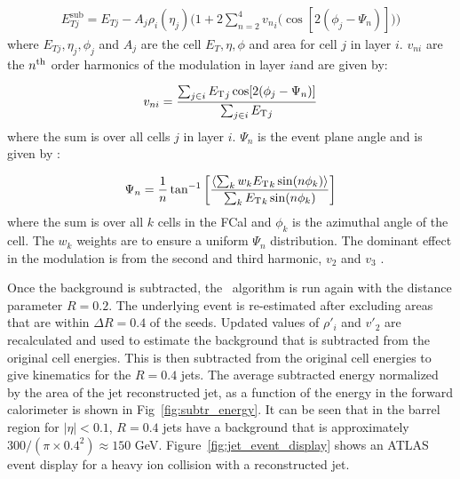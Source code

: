 \begin{align}
E_{Tj}^{\mathrm{sub}} = E_{Tj} - A_j \rho_i (\eta_j) \Big(1+2 \sum_{n=2}^{4} {v_{n}}_i \big(\cos[2(\phi_j-\Psi_n)] \big) \Big)
\end{align}
where $E_{Tj} , \eta_j, \phi_j$ and $A_j$ are the cell $E_T, \eta, \phi$ and area for cell $j$ in layer $i$.
$v_{ni}$ are the $n^{\rm th}$ order harmonics of the modulation in layer $i$and are given by:

\begin{align}
v_{ni} = \frac{\sum_{j \in i} \mbox{$E_{\mathrm{T}}$}_j \cos[2(\phi_j-\Psi_n)]}{\sum_{j \in i} \mbox{$E_{\mathrm{T}}$}_j}
\end{align}
where the sum is over all cells $j$ in layer $i$.
$\Psi_n$ is the event plane angle and is given by \cite{ATLAS:2012at}:

\begin{align}
\Psi_n = \frac{1}{n} \tan^{-1} \left[ \frac{\langle \sum_k w_k \mbox{$E_{\mathrm{T}}$}_k \sin(n\phi_k) \rangle}{\sum_k \mbox{$E_{\mathrm{T}}$}_k \sin(n\phi_k)} \right]
\end{align}
where the sum is over all $k$ cells in the FCal and $\phi_k$ is the azimuthal angle of the cell.
The $w_k$ weights are to ensure a uniform $\Psi_n$ distribution.
The dominant effect in the modulation is from the second and third harmonic, $v_2$ and $v_3$ \cite{ATLAS:2012at}.

Once the background is subtracted, the \antikt\ algorithm is run again with the distance parameter $R = 0.2$.
The underlying event is re-estimated after excluding areas that are within $\Delta R = 0.4$ of the seeds.
Updated values of $\rho{'}_i$ and $v{'}_2$ are recalculated and used to estimate the background that is subtracted from the original cell energies.
This is then subtracted from the original cell energies to give kinematics for the $R= 0.4$ jets.
The average subtracted energy normalized by the area of the jet reconstructed jet, as a function of the energy in the forward calorimeter is shown in Fig~\ref{fig:subtr_energy}.
It can be seen that in the barrel region for $|\eta| < 0.1$, $R=0.4$ jets have a background that is approximately $300/(\pi\times 0.4^2) \approx 150$ GeV.
Figure~\ref{fig:jet_event_display} shows an ATLAS event display for a heavy ion collision with a reconstructed jet.

